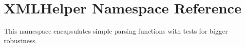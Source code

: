 \hypertarget{namespaceXMLHelper}{\section{\-X\-M\-L\-Helper \-Namespace \-Reference}
\label{namespaceXMLHelper}
}


\-This namespace encapsulates simple parsing functions with tests for bigger robustness.  


